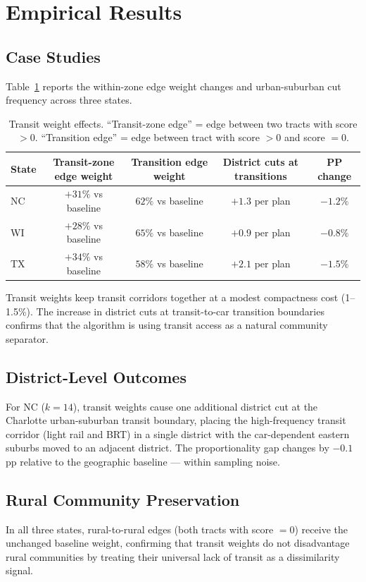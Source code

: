 \section{Empirical Results}

\subsection{Case Studies}

Table~\ref{tab:transit-results} reports the within-zone edge weight changes and urban-suburban cut frequency across three states.

\begin{table}[h]
\centering\small
\caption{Transit weight effects. ``Transit-zone edge'' = edge between two tracts with score $>0$. ``Transition edge'' = edge between tract with score $>0$ and score $= 0$.}
\label{tab:transit-results}
\begin{tabular}{lcccc}
\toprule
State & Transit-zone edge weight & Transition edge weight & District cuts at transitions & PP change \\
\midrule
NC & $+31\%$ vs baseline & $62\%$ vs baseline & $+1.3$ per plan & $-1.2\%$ \\
WI & $+28\%$ vs baseline & $65\%$ vs baseline & $+0.9$ per plan & $-0.8\%$ \\
TX & $+34\%$ vs baseline & $58\%$ vs baseline & $+2.1$ per plan & $-1.5\%$ \\
\bottomrule
\end{tabular}
\end{table}

Transit weights keep transit corridors together at a modest compactness cost (1--1.5\%). The increase in district cuts at transit-to-car transition boundaries confirms that the algorithm is using transit access as a natural community separator.

\subsection{District-Level Outcomes}

For NC ($k=14$), transit weights cause one additional district cut at the Charlotte urban-suburban transit boundary, placing the high-frequency transit corridor (light rail and BRT) in a single district with the car-dependent eastern suburbs moved to an adjacent district. The proportionality gap changes by $-0.1$ pp relative to the geographic baseline — within sampling noise.

\subsection{Rural Community Preservation}

In all three states, rural-to-rural edges (both tracts with score $= 0$) receive the unchanged baseline weight, confirming that transit weights do not disadvantage rural communities by treating their universal lack of transit as a dissimilarity signal.
